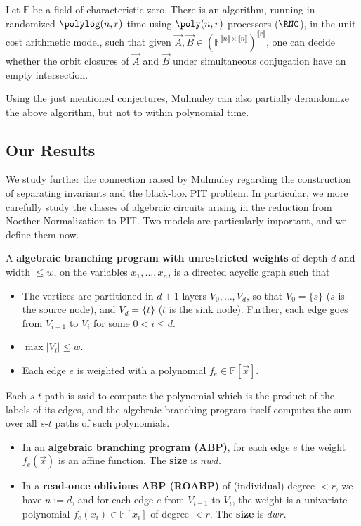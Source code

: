 \documentclass[letterpaper,11pt]{article}
\numberwithin{equation}{section}
\theoremstyle{plain}
\theoremstyle{remark}
\newcommand{\zr}[1]{{\llbracket {#1}\rrbracket}}
\newcommand{\F}{\mathbb{F}}
\newcommand{\eqdef}{:=}
\begin{document}
\begin{theorem*}
	Let $\F$ be a field of characteristic zero. There is an algorithm, running in randomized $\polylog(n,r)$-time using $\poly(n,r)$-processors ($\RNC$), in the unit cost arithmetic model, such that given $\vec{A},\vec{B}\in(\F^{\zr{n}\times \zr{n}})^{\zr{r}}$, one can decide whether the orbit closures of $\vec{A}$ and $\vec{B}$ under simultaneous conjugation have an empty intersection.
\end{theorem*}

Using the just mentioned conjectures, Mulmuley can also partially derandomize the above algorithm, but not to within polynomial time.

\subsection{Our Results}

We study further the connection raised by Mulmuley regarding the construction of separating invariants and the black-box PIT problem.  In particular, we more carefully study the classes of algebraic circuits arising in the reduction from Noether Normalization to PIT.  Two models are particularly important, and we define them now.

\begin{definition}\label{def: ABP}
	A \textbf{algebraic branching program with unrestricted weights} of depth $d$ and width $\le w$, on the variables $x_1,\ldots,x_n$, is a directed acyclic graph such that
	\begin{itemize}
		\item The vertices are partitioned in $d+1$ layers $V_0,\ldots,V_d$, so that $V_0=\{s\}$ ($s$ is the source node), and $V_d=\{t\}$ ($t$ is the sink node). Further, each edge goes from $V_{i-1}$ to $V_{i}$ for some $0< i\le d$.
		\item $\max|V_i|\le w$.
		\item Each edge $e$ is weighted with a polynomial $f_e\in\F[\vec{x}]$.
	\end{itemize}

	Each $s$-$t$ path is said to compute the polynomial which is the product of the labels of its edges, and the algebraic branching program itself computes the sum over all $s$-$t$ paths of such polynomials.

	\begin{itemize}
		\item In an \textbf{algebraic branching program (ABP)}, for each edge $e$ the weight $f_e(\vec{x})$ is an affine function.  The \textbf{size} is $nwd$.
		\item In a \textbf{read-once oblivious ABP (ROABP)} of (individual) degree $<r$, we have $n\eqdef d$, and for each edge $e$ from $V_{i-1}$ to $V_i$, the weight is a univariate polynomial $f_e(x_i)\in\F[x_i]$ of degree $<r$. The \textbf{size} is $dwr$.
	\end{itemize}
\end{definition}
\end{document}
